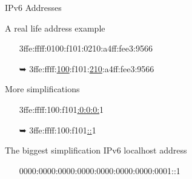 \begin{frame}{IPv6 Addresses}
 \begin{iblock}{A real life address example}{\ttfamily
    \begin{itemize}
    \item[] 3ffe:ffff:0100:f101:0210:a4ff:fee3:9566
    \item[{\dejavu ➥}]
      3ffe:ffff:\underline{100}:f101:\underline{210}:a4ff:fee3:9566
    \end{itemize}}
 \end{iblock}
 \begin{iblock}{More simplifications}{\ttfamily
    \begin{itemize}
    \item[] 3ffe:ffff:100:f101\underline{:0:0:0:}1
    \item[{\dejavu ➥}] 3ffe:ffff:100:f101\underline{::}1
    \end{itemize}}
 \end{iblock}
 \begin{iblock}{The biggest simplification}
   IPv6 localhost address{\ttfamily
     \begin{itemize}
     \item[] 0000:0000:0000:0000:0000:0000:0000:0001\quad ::1
     \end{itemize}}
 \end{iblock}
\end{frame}


  
